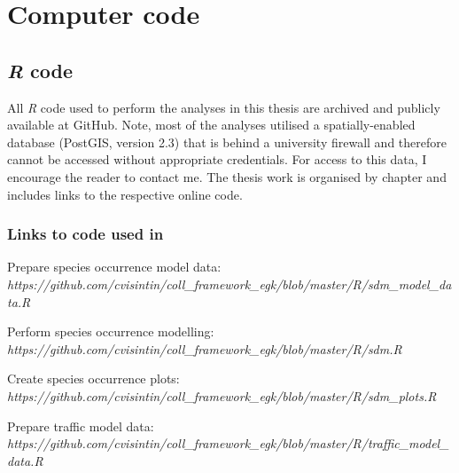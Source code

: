 \chapter{Computer code}\label{apx:A}
\newpage

\section{\textit{R} code}

All \textit{R} code used to perform the analyses in this thesis are archived and publicly available at GitHub. Note, most of the analyses utilised a spatially-enabled database (PostGIS, version 2.3) that is behind a university firewall and therefore cannot be accessed without appropriate credentials. For access to this data, I encourage the reader to contact me. The thesis work is organised by chapter and includes links to the respective online code.

\subsection{Links to code used in }

\noindent Prepare species occurrence model data:\\
\textit{https://github.com/cvisintin/coll\_framework\_egk/blob/master/R/sdm\_model\_data.R}
%

\vspace{.3cm}
\noindent Perform species occurrence modelling:\\
\textit{https://github.com/cvisintin/coll\_framework\_egk/blob/master/R/sdm.R}
%

\vspace{.3cm}
\noindent Create species occurrence plots:\\
\textit{https://github.com/cvisintin/coll\_framework\_egk/blob/master/R/sdm\_plots.R}
%

\vspace{.3cm}
\noindent Prepare traffic model data:\\
\textit{https://github.com/cvisintin/coll\_framework\_egk/blob/master/R/traffic\_model\_data.R}
%

